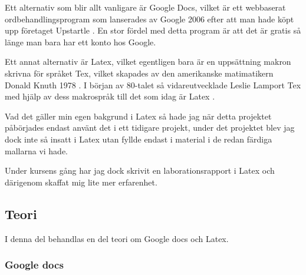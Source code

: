 
Ett alternativ som blir allt vanligare är Google Docs, vilket är ett webbaserat ordbehandlingsprogram som lanserades av Google 2006 \cite{docs_launch} efter att man hade köpt upp företaget Upstartle \cite{upstartle}. En stor fördel med detta program är att det är gratis så länge man bara har ett konto hos Google.


Ett annat alternativ är Latex, vilket egentligen bara är en uppsättning makron skrivna för språket Tex, vilket skapades av den amerikanske matimatikern Donald Knuth 1978 \cite{donald_knuth}. I början av 80-talet så vidareutvecklade Leslie Lamport Tex med hjälp av dess makrospråk till det som 
idag är Latex \cite{leslie_lamport}.

Vad det gäller min egen bakgrund i Latex så hade jag när detta projektet påbörjades endast använt det i ett tidigare projekt, under det projektet blev jag dock inte så insatt i Latex utan fyllde endast i material i de redan färdiga mallarna vi hade.

Under kursens gång har jag dock skrivit en laborationsrapport i Latex och därigenom skaffat mig lite mer erfarenhet.


\subsection{Teori}
I denna del behandlas en del teori om Google docs och Latex.
\subsubsection{Google docs} %


